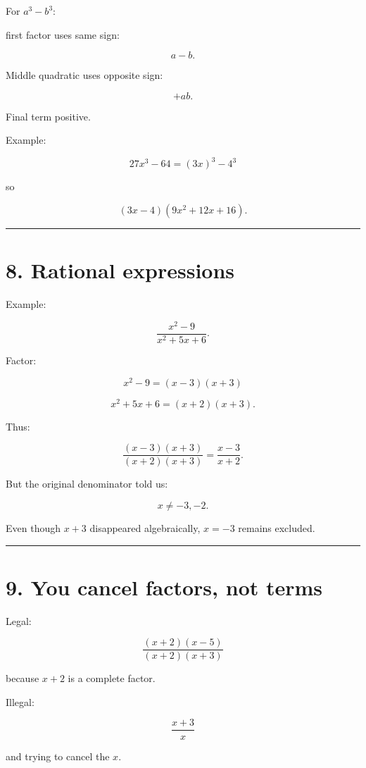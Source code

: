 \documentclass[
]{article}
\begin{document}
For \(a^3-b^3\):

first factor uses same sign:

\[
a-b.
\]

Middle quadratic uses opposite sign:

\[
+a b.
\]

Final term positive.

Example:

\[
27x^3-64
=
(3x)^3-4^3
\]

so

\[
\boxed{(3x-4)(9x^2+12x+16)}.
\]

\begin{center}\rule{0.5\linewidth}{0.5pt}\end{center}

\section{8. Rational expressions}\label{rational-expressions}

Example:

\[
\frac{x^2-9}{x^2+5x+6}.
\]

Factor:

\[
x^2-9=(x-3)(x+3)
\]

\[
x^2+5x+6=(x+2)(x+3).
\]

Thus:

\[
\frac{(x-3)(x+3)}
{(x+2)(x+3)}
=
\boxed{\frac{x-3}{x+2}}.
\]

But the original denominator told us:

\[
x\neq -3,-2.
\]

Even though \(x+3\) disappeared algebraically, \(x=-3\) remains
excluded.

\begin{center}\rule{0.5\linewidth}{0.5pt}\end{center}

\section{9. You cancel factors, not
terms}\label{you-cancel-factors-not-terms}

Legal:

\[
\frac{(x+2)(x-5)}{(x+2)(x+3)}
\]

because \(x+2\) is a complete factor.

Illegal:

\[
\frac{x+3}{x}
\]

and trying to cancel the \(x\).
\end{document}
